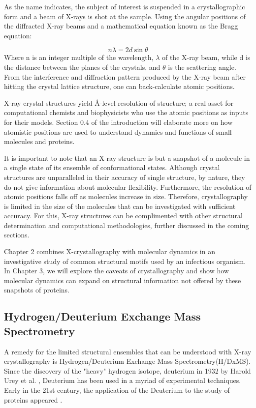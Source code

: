 \documentclass[12pt]{ucsddissertation}
\begin{document}
\begin{dissertationintroduction}
As the name indicates, the subject of interest is suspended in a crystallographic form and a beam of X-rays is shot at the sample. Using the angular positions of the diffracted X-ray beams and a mathematical equation known as the Bragg equation:

\begin{equation}
n\lambda=2d\sin\theta
\end{equation}
Where n is an integer multiple of the wavelength, $\lambda$ of the X-ray beam, while d is the distance between the planes of the crystals, and $\theta$ is the scattering angle. From the interference and diffraction pattern produced by the X-ray beam after hitting the crystal lattice structure, one can back-calculate atomic positions. 

X-ray crystal structures yield \si{\angstrom}-level resolution of structure; a real asset for computational chemists and biophysicists who use the atomic positions as inputs for their models. Section 0.4 of the introduction will elaborate more on how atomistic positions are used to understand dynamics and functions of small molecules and proteins. 

It is important to note that an X-ray structure is but a snapshot of a molecule in a single state of its ensemble of conformational states. Although crystal structures are unparalleled in their accuracy of single structure, by nature, they do not give information about molecular flexibility.  Furthermore, the resolution of atomic positions falls off as molecules increase in size. Therefore, crystallography is limited in the size of the molecules that can be investigated with sufficient accuracy. For this, X-ray structures can be complimented with other structural determination and computational methodologies, further discussed in the coming sections. 

Chapter 2 combines X-crystallography with molecular dynamics in an investigative study of common structural motifs used by an infectious organism. In Chapter 3, we will explore the caveats of crystallography and show how molecular dynamics can expand on structural information not offered by these snapshots of proteins. 

\subsection{Hydrogen/Deuterium Exchange Mass Spectrometry}
A remedy for the limited structural ensembles that can be understood with X-ray crystallography is Hydrogen/Deuterium Exchange Mass Spectrometry(H/DxMS).  Since the discovery of the "heavy" hydrogen isotope, deuterium in 1932 by Harold Urey et al. \cite{Urey1932}, Deuterium has been used in a myriad of experimental techniques. Early in the 21st century, the application of the Deuterium to the study of proteins appeared \cite{Engen2001}. 


\end{dissertationintroduction}
\end{document}
